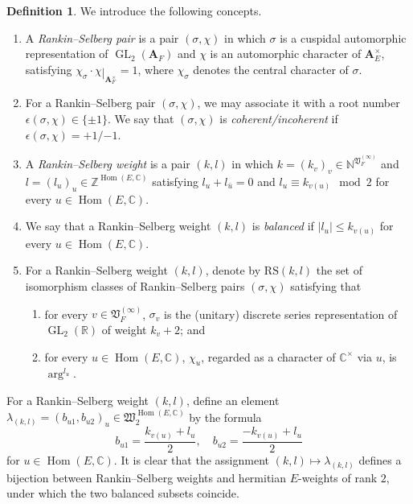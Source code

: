 \documentclass[12pt]{amsart}
\numberwithin{equation}{section}
\theoremstyle{plain}
\theoremstyle{definition}
\newtheorem{definition}[proposition]{Definition}
\theoremstyle{remark}
\renewcommand{\b}[1]{\mathbf{#1}}
\renewcommand{\d}[1]{\mathbb{#1}}
\newcommand{\f}[1]{\mathfrak{#1}}
\renewcommand{\r}[1]{\mathrm{#1}}
\renewcommand{\(}{\left(}
\renewcommand{\)}{\right)}
\newcommand{\res}{\mathbin{|}}
\newcommand{\ol}[1]{\overline{#1}{}}
\renewcommand{\leq}{\leqslant}
\newcommand{\bA}{\b A}
\newcommand{\dC}{\d C}
\newcommand{\dN}{\d N}
\newcommand{\dR}{\d R}
\newcommand{\dZ}{\d Z}
\newcommand{\fV}{\f V}
\newcommand{\fW}{\f W}
\newcommand{\RS}{\r{RS}}
\DeclareMathOperator{\GL}{GL}
\DeclareMathOperator{\Hom}{Hom}
\begin{document}
\begin{definition}\label{de:rs_pair}
We introduce the following concepts.
\begin{enumerate}
  \item A \emph{Rankin--Selberg pair} is a pair $(\sigma,\chi)$ in which $\sigma$ is a cuspidal automorphic representation of $\GL_2(\bA_F)$ and $\chi$ is an automorphic character of $\bA_E^\times$, satisfying $\chi_\sigma\cdot\chi\res_{\bA_F^\times}=1$, where $\chi_\sigma$ denotes the central character of $\sigma$.

  \item For a Rankin--Selberg pair $(\sigma,\chi)$, we may associate it with a root number $\epsilon(\sigma,\chi)\in\{\pm 1\}$. We say that $(\sigma,\chi)$ is \emph{coherent/incoherent} if $\epsilon(\sigma,\chi)=+1/{-1}$.

  \item A \emph{Rankin--Selberg weight} is a pair $(k,l)$ in which $k=(k_v)_v\in\dN^{\fV_F^{(\infty)}}$ and $l=(l_u)_u\in\dZ^{\Hom(E,\dC)}$ satisfying $l_u+l_{\ol{u}}=0$ and $l_u\equiv k_{v(u)}\mod 2$ for every $u\in\Hom(E,\dC)$.

  \item We say that a Rankin--Selberg weight $(k,l)$ is \emph{balanced} if $|l_u|\leq k_{v(u)}$ for every $u\in\Hom(E,\dC)$.

  \item For a Rankin--Selberg weight $(k,l)$, denote by $\RS(k,l)$ the set of isomorphism classes of Rankin--Selberg pairs $(\sigma,\chi)$ satisfying that
      \begin{enumerate}
         \item for every $v\in\fV_F^{(\infty)}$, $\sigma_v$ is the (unitary) discrete series representation of $\GL_2(\dR)$ of weight $k_v+2$; and

         \item for every $u\in\Hom(E,\dC)$, $\chi_u$, regarded as a character of $\dC^\times$ via $u$, is $\arg^{l_u}$.
      \end{enumerate}
\end{enumerate}
\end{definition}

For a Rankin--Selberg weight $(k,l)$, define an element $\lambda_{(k,l)}=(b_{u1},b_{u2})_u\in\fW_2^{\Hom(E,\dC)}$ by the formula
\[
b_{u1}=\frac{k_{v(u)}+l_u}{2},\quad b_{u2}=\frac{-k_{v(u)}+l_u}{2}
\]
for $u\in\Hom(E,\dC)$. It is clear that the assignment $(k,l)\mapsto\lambda_{(k,l)}$ defines a bijection between Rankin--Selberg weights and hermitian $E$-weights of rank $2$, under which the two balanced subsets coincide.
\end{document}
